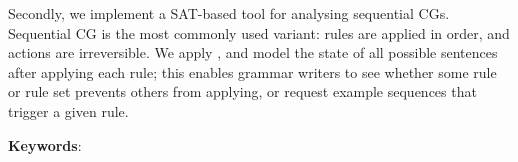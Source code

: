 Secondly, we implement a SAT-based tool for analysing sequential CGs.
Sequential CG is the most commonly used variant: rules are applied in order, 
and actions are irreversible.
We apply , 
and model the state of all possible sentences after applying each rule;
this enables grammar writers to see whether some rule or rule set prevents
others from applying, or request example sequences that trigger a given rule.

\bigskip
\noindent
\textbf{Keywords}: \emph{\lickeywords}
